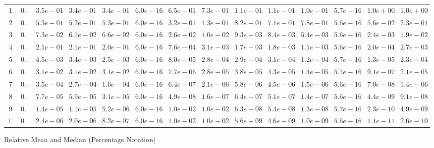 \begin{tabular}{cccccccccccccc}
$1$ & $0.5$ & $3.5e-01$ & $3.4e-01$ & $3.4e-01$ & $6.0e-16$ & $6.5e-01$ & $7.3e-01$ & $1.1e-01$ & $1.1e-01$ & $1.0e-01$ & $5.7e-16$ & $1.0e+00$ & $1.0e+00$\\
$2$ & $0.5$ & $5.3e-01$ & $5.2e-01$ & $5.3e-01$ & $6.0e-16$ & $3.2e-01$ & $4.3e-01$ & $8.2e-01$ & $7.1e-01$ & $7.8e-01$ & $5.6e-16$ & $5.6e-02$ & $2.3e-01$\\
$3$ & $0.5$ & $7.3e-02$ & $6.7e-02$ & $6.6e-02$ & $6.0e-16$ & $2.6e-02$ & $4.0e-02$ & $9.3e-03$ & $8.4e-03$ & $5.4e-03$ & $5.6e-16$ & $2.4e-03$ & $1.9e-02$\\
$4$ & $0.5$ & $2.1e-01$ & $2.1e-01$ & $2.0e-01$ & $6.0e-16$ & $7.6e-04$ & $3.1e-03$ & $1.7e-03$ & $1.8e-03$ & $1.1e-03$ & $5.6e-16$ & $2.0e-04$ & $2.7e-03$\\
$5$ & $0.5$ & $4.5e-03$ & $3.4e-03$ & $2.5e-03$ & $6.0e-16$ & $8.0e-05$ & $2.8e-04$ & $2.9e-04$ & $3.1e-04$ & $1.2e-04$ & $5.7e-16$ & $1.3e-05$ & $2.3e-04$\\
$6$ & $0.5$ & $3.1e-02$ & $3.1e-02$ & $3.1e-02$ & $6.0e-16$ & $7.7e-06$ & $2.8e-05$ & $3.8e-05$ & $4.3e-05$ & $1.4e-05$ & $5.7e-16$ & $9.1e-07$ & $2.1e-05$\\
$7$ & $0.5$ & $3.5e-04$ & $2.7e-04$ & $1.6e-04$ & $6.0e-16$ & $6.4e-07$ & $2.1e-06$ & $5.8e-06$ & $4.5e-06$ & $1.5e-06$ & $5.6e-16$ & $7.0e-08$ & $1.4e-06$\\
$8$ & $0.5$ & $7.7e-05$ & $5.9e-05$ & $3.1e-05$ & $6.0e-16$ & $4.9e-08$ & $1.6e-07$ & $6.4e-07$ & $5.1e-07$ & $1.4e-07$ & $5.6e-16$ & $4.4e-09$ & $9.1e-08$\\
$9$ & $0.5$ & $1.4e-05$ & $1.1e-05$ & $5.2e-06$ & $6.0e-16$ & $1.0e-02$ & $1.0e-02$ & $6.3e-08$ & $5.4e-08$ & $1.3e-08$ & $5.7e-16$ & $2.3e-10$ & $4.9e-09$\\
$10$ & $0.5$ & $2.4e-06$ & $2.0e-06$ & $8.2e-07$ & $6.0e-16$ & $1.0e-02$ & $1.0e-02$ & $5.6e-09$ & $4.6e-09$ & $1.0e-09$ & $5.6e-16$ & $1.1e-11$ & $2.6e-10$\\
\end{tabular}
Relative Mean and Median (Percentage Notation)
